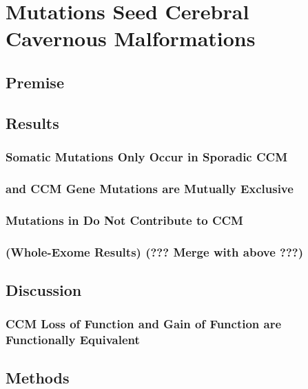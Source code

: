 \chapter{ Mutations Seed Cerebral Cavernous Malformations}

\section{Premise}

\section{Results}
\subsection{ Somatic Mutations Only Occur in Sporadic CCM}
\subsection{ and CCM Gene Mutations are Mutually Exclusive}
\subsection{Mutations in  Do Not Contribute to CCM}
\subsection{(Whole-Exome Results) (??? Merge with above ???)} 

\section{Discussion}
\subsection{CCM Loss of Function and  Gain of Function are Functionally Equivalent}


\section{Methods}